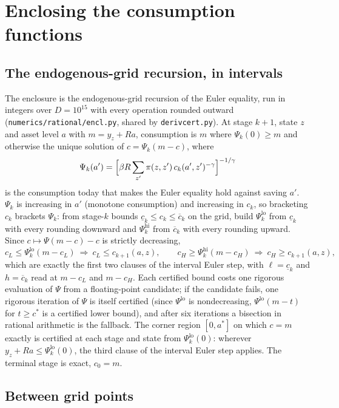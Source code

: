 \documentclass[11pt]{article}
\theoremstyle{definition}
\theoremstyle{remark}
\begin{document}
\section{Enclosing the consumption functions}\label{sec:encl}

\subsection{The endogenous-grid recursion, in intervals}

The enclosure is the endogenous-grid recursion of the Euler equality, run in integers over
$D=10^{15}$ with every operation rounded outward (\texttt{numerics/rational/encl.py}, shared by
\texttt{derivcert.py}). At stage $k+1$, state $z$ and asset level $a$ with $m=y_z+Ra$, consumption
is $m$ where $\Psi_k(0)\ge m$ and otherwise the unique solution of $c=\Psi_k(m-c)$, where
\[
  \Psi_k(a')=\Bigl[\beta R\sum_{z'}\pi(z,z')\,c_k(a',z')^{-\gamma}\Bigr]^{-1/\gamma}
\]
is the consumption today that makes the Euler equality hold against saving $a'$. $\Psi_k$ is
increasing in $a'$ (monotone consumption) and increasing in $c_k$, so bracketing $c_k$ brackets
$\Psi_k$: from stage-$k$ bounds $\underline c_k\le c_k\le\overline c_k$ on the grid, build
$\Psi^{\mathrm{lo}}_k$ from $\underline c_k$ with every rounding downward and $\Psi^{\mathrm{hi}}_k$
from $\overline c_k$ with every rounding upward. Since $c\mapsto\Psi(m-c)-c$ is strictly decreasing,
\[
  c_L\le\Psi^{\mathrm{lo}}_k(m-c_L)\ \Rightarrow\ c_L\le c_{k+1}(a,z),\qquad
  c_H\ge\Psi^{\mathrm{hi}}_k(m-c_H)\ \Rightarrow\ c_H\ge c_{k+1}(a,z),
\]
which are exactly the first two clauses of the interval Euler step, with $\ell=\underline c_k$ and
$h=\overline c_k$ read at $m-c_L$ and $m-c_H$. Each certified bound costs one rigorous evaluation
of $\Psi$ from a floating-point candidate; if the candidate fails, one rigorous iteration of
$\Psi$ is itself certified (since $\Psi^{\mathrm{lo}}$ is nondecreasing, $\Psi^{\mathrm{lo}}(m-t)$
for $t\ge c^*$ is a certified lower bound), and after six iterations a bisection in rational
arithmetic is the fallback. The corner region $[0,a^*]$ on which $c=m$ exactly is certified at each
stage and state from $\Psi^{\mathrm{lo}}_k(0)$: wherever $y_z+Ra\le\Psi^{\mathrm{lo}}_k(0)$, the
third clause of the interval Euler step applies. The terminal stage is exact, $c_0=m$.

\subsection{Between grid points}
\end{document}
